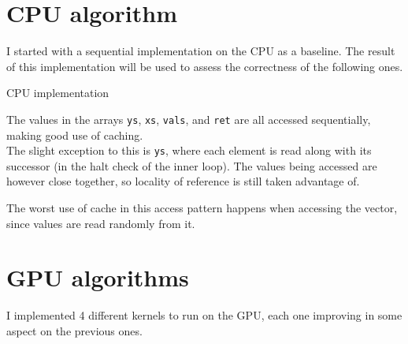 \documentclass{article}
\begin{document}
\section{CPU algorithm}
I started with a sequential implementation on the CPU as a baseline. The result of this implementation will be used to assess the correctness of the following ones.
\newcommand\commentFont[1]{\ttfamily\textcolor{blue}{#1}}
\begin{algorithm}[ht]
    \label{algo:CPU}
    \caption{CPU implementation}
\end{algorithm}
The values in the arrays \texttt{ys}, \texttt{xs}, \texttt{vals}, and \texttt{ret} are all accessed sequentially, making good use of caching.\\
The slight exception to this is \texttt{ys}, where each element is read along with its successor (in the halt check of the inner loop). The values being accessed are however close together, so locality of reference is still taken advantage of.

The worst use of cache in this access pattern happens when accessing the vector, since values are read randomly from it.

\section{GPU algorithms}
I implemented 4 different kernels to run on the GPU, each one improving in some aspect on the previous ones.
\end{document}
